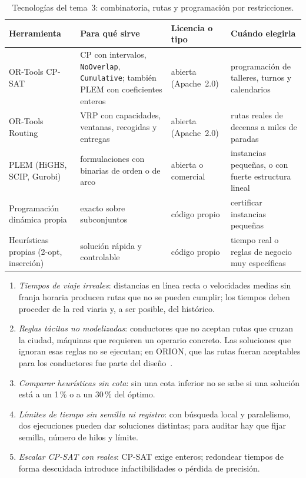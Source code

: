 \begin{table}[h]
\centering\small
\caption{Tecnologías del tema~3: combinatoria, rutas y programación por restricciones.}\label{tab:tec3}
\begin{tabularx}{\textwidth}{@{}l>{\raggedright\arraybackslash}X>{\raggedright\arraybackslash}p{2.2cm}>{\raggedright\arraybackslash}X@{}}
\toprule
Herramienta & Para qué sirve & Licencia o tipo & Cuándo elegirla \\
\midrule
OR-Tools CP-SAT~\cite{ortools-cpsat} & CP con intervalos, \texttt{NoOverlap}, \texttt{Cumulative}; también PLEM con coeficientes enteros & abierta (Apache~2.0) & programación de talleres, turnos y calendarios \\
OR-Tools Routing~\cite{ortools-vrptw} & VRP con capacidades, ventanas, recogidas y entregas & abierta (Apache~2.0) & rutas reales de decenas a miles de paradas \\
PLEM (HiGHS, SCIP, Gurobi) & formulaciones con binarias de orden o de arco & abierta o comercial & instancias pequeñas, o con fuerte estructura lineal \\
Programación dinámica propia & exacto sobre subconjuntos & código propio & certificar instancias pequeñas \\
Heurísticas propias (2-opt, inserción) & solución rápida y controlable & código propio & tiempo real o reglas de negocio muy específicas \\
\bottomrule
\end{tabularx}
\end{table}

\begin{observacion}\label{obs:errores3}
\begin{enumerate}[label=(\alph*)]
  \item \emph{Tiempos de viaje irreales}: distancias en línea recta o velocidades medias sin franja horaria producen rutas que no se pueden cumplir; los tiempos deben proceder de la red viaria y, a ser posible, del histórico.
  \item \emph{Reglas tácitas no modelizadas}: conductores que no aceptan rutas que cruzan la ciudad, máquinas que requieren un operario concreto. Las soluciones que ignoran esas reglas no se ejecutan; en ORION, que las rutas fueran aceptables para los conductores fue parte del diseño~\cite{orion}.
  \item \emph{Comparar heurísticas sin cota}: sin una cota inferior no se sabe si una solución está a un 1\,\% o a un 30\,\% del óptimo.
  \item \emph{Límites de tiempo sin semilla ni registro}: con búsqueda local y paralelismo, dos ejecuciones pueden dar soluciones distintas; para auditar hay que fijar semilla, número de hilos y límite.
  \item \emph{Escalar CP-SAT con reales}: CP-SAT exige enteros; redondear tiempos de forma descuidada introduce infactibilidades o pérdida de precisión.
\end{enumerate}
\end{observacion}

